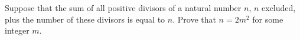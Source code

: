 Suppose that the sum of all positive divisors of a natural number $n$,  $n$ excluded, plus the number of these divisors is equal to $n$. Prove that $n = 2m^2$ for some integer $m$.